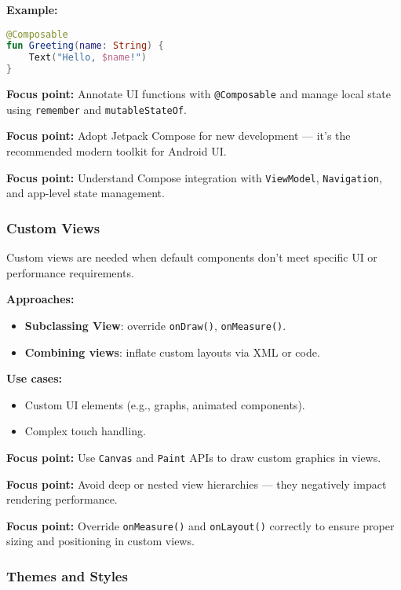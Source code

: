 \documentclass[a4paper,12pt]{article}
\begin{document}
\textbf{Example:}
\begin{lstlisting}[language=Kotlin]
@Composable
fun Greeting(name: String) {
    Text("Hello, $name!")
}
\end{lstlisting}

\textbf{Focus point:} Annotate UI functions with \texttt{@Composable} and manage local state using \texttt{remember} and \texttt{mutableStateOf}.

\textbf{Focus point:} Adopt Jetpack Compose for new development — it's the recommended modern toolkit for Android UI.

\textbf{Focus point:} Understand Compose integration with \texttt{ViewModel}, \texttt{Navigation}, and app-level state management.

\subsubsection{Custom Views}

Custom views are needed when default components don’t meet specific UI or performance requirements.

\textbf{Approaches:}
\begin{itemize}
  \item \textbf{Subclassing View}: override \texttt{onDraw()}, \texttt{onMeasure()}.
  \item \textbf{Combining views}: inflate custom layouts via XML or code.
\end{itemize}

\textbf{Use cases:}
\begin{itemize}
  \item Custom UI elements (e.g., graphs, animated components).
  \item Complex touch handling.
\end{itemize}

\textbf{Focus point:} Use \texttt{Canvas} and \texttt{Paint} APIs to draw custom graphics in views.

\textbf{Focus point:} Avoid deep or nested view hierarchies — they negatively impact rendering performance.

\textbf{Focus point:} Override \texttt{onMeasure()} and \texttt{onLayout()} correctly to ensure proper sizing and positioning in custom views.

\subsubsection{Themes and Styles}
\end{document}
